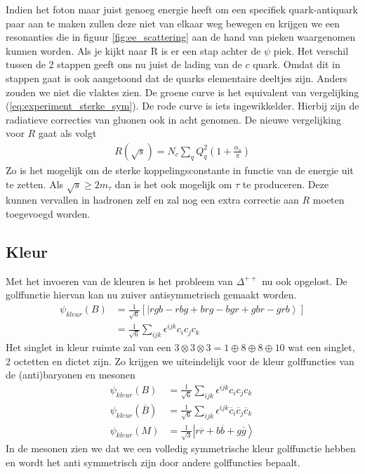 \documentclass[../main.tex]{subfiles}
\begin{document}
Indien het foton maar juist genoeg energie heeft om een specifiek quark-antiquark paar aan te maken zullen deze niet van elkaar weg bewegen en krijgen we een resonanties die in figuur \ref{fig:ee_scattering} aan de hand van pieken waargenomen kunnen worden. Als je kijkt naar R is er een stap achter de $\psi$ piek. Het verschil tussen de 2 stappen geeft ons nu juist de lading van de $c$ quark. Omdat dit in stappen gaat is ook aangetoond dat de quarks elementaire deeltjes zijn. Anders zouden we niet die vlaktes zien. De groene curve is het equivalent van vergelijking (\ref{eq:experiment_sterke_sym}). De rode curve is iets ingewikkelder. Hierbij zijn de radiatieve correcties van gluonen ook in acht genomen. De nieuwe vergelijking voor $R$ gaat als volgt
\begin{equation}
    \begin{aligned}
        \label{eq:experiment_sterke_sym_extended}
        R(\sqrt{s}) = N_c\sum_q Q_q^2 (1+\frac{\alpha_s}{\pi})
    \end{aligned}
\end{equation}
Zo is het mogelijk om de sterke koppelingsconstante in functie van de energie uit te zetten. Als $\sqrt{s}\geq 2m_\tau$ dan is het ook mogelijk om $\tau$ te produceren. Deze kunnen vervallen in hadronen zelf en zal nog een extra correctie aan $R$ moeten toegevoegd worden.

\subsection{Kleur}%
\label{sub:kleur}

Met het invoeren van de kleuren is het probleem van $\Delta^{++}$ nu ook opgelost. De golffunctie hiervan kan nu zuiver antisymmetrisch gemaakt worden.
\begin{equation}
    \begin{aligned}
        \label{eq:golffunctie_baryon}
        \psi_{kleur}(B) &= \frac{1}{\sqrt{6}} [\left|rgb-rbg+brg-bgr+gbr-grb\right>]\\
                        &= \frac{1}{\sqrt{6}} \sum_{ijk} \epsilon^{ijk}c_ic_jc_k
    \end{aligned}
\end{equation}
Het singlet in kleur ruimte zal van een $3\otimes 3\otimes 3 = 1\oplus 8\oplus 8\oplus 10$ wat een singlet, 2 octetten en dictet zijn. Zo krijgen we uiteindelijk voor de kleur golffuncties van de (anti)baryonen en mesonen
\begin{equation}
    \begin{aligned}
        \label{eq:kleur_golffunctie}
        \psi_{kleur}(B) &= \frac{1}{\sqrt{6}} \sum_{ijk} \epsilon^{ijk}c_ic_jc_k\\
        \psi_{kleur}(\overline B) &= \frac{1}{\sqrt{6}} \sum_{ijk} \epsilon^{ijk}\overline c_i \overline c_j\overline c_k\\
        \psi_{kleur}(M) &= \frac{1}{\sqrt{3}} \left|r\overline r + b\overline b + g\overline g \right>
    \end{aligned}
\end{equation}
In de mesonen zien we dat we een volledig symmetrische kleur golffunctie hebben en wordt het anti symmetrisch zijn door andere golffuncties bepaalt.
\end{document}
